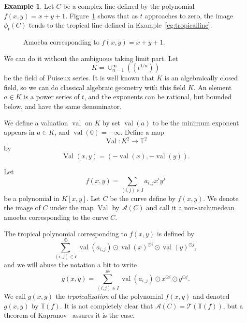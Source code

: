 \documentclass{amsart}
\theoremstyle{definition}
\newtheorem{eg}{Example}[section]
\theoremstyle{remark}
\begin{document}
\begin{eg}
Let $C$ be a complex line defined by the polynomial $f(x,y) = x + y +1$. Figure~\ref{fig:amoeba} shows that as $t$ approaches to zero, the image $\phi_t(C)$ tends to the tropical line defined in Example~\ref{eg:tropicalline}.
\end{eg}

\begin{figure}[htbp]
\begin{center}
\caption{Amoeba corresponding to $f(x,y) = x + y +1$.}\label{fig:amoeba}
\end{center}
\end{figure}

We can do it without the ambiguous taking limit part. Let 
\[
K = \cup_{n=1}^{\infty} ((t^{1/n}))
\]
be the field of Puiseux series. It is well known that $K$ is an algebraically closed field, so we can do classical algebraic geometry with this field $K$. An element $a \in K$ is a power series of $t$, and the exponents can be rational, but bounded below, and have the same denominator. 

We define a valuation $\operatorname{val}$ on $K$ by set $\operatorname{val}(a)$ to be the minimum exponent appears in $a \in K$, and $\operatorname{val}(0) = -\infty$. Define a map
\[
\operatorname{Val} \colon K^2 \to {\mathbb{T}}^2
\]
by 
\[
\operatorname{Val}(x,y) = (-\operatorname{val}(x), -\operatorname{val}(y)).
\]

Let 
\[
f(x,y) = \sum_{(i,j) \in I} a_{i,j} x^i y^j
\]
be a polynomial in $K[x,y]$. Let $C$ be the curve define by $f(x,y)$. We denote the image of $C$ under the map $\operatorname{Val}$ by ${\mathcal{A}}(C)$ and call it a non-archimedean amoeba corresponding to the curve $C$. 

The tropical polynomial corresponding to $f(x,y)$ is defined by
\[
\sum_{(i,j) \in I}^{\oplus} \operatorname{val}(a_{i,j}) {\odot} \operatorname{val}(x)^{{\odot} i} {\odot} \operatorname{val}(y)^{{\odot} j},
\]
and we will abuse the notation a bit to write
\[
g(x,y) = \sum_{(i,j) \in I}^{\oplus} \operatorname{val}(a_{i,j}) {\odot} x^{{\odot} i} {\odot}  y^{{\odot} j}.
\]
We call $g(x,y)$ the \emph{trpoicalization} of the polynomial $f(x,y)$ and denoted $g(x,y)$ by ${\mathbb{T}}(f)$. It is not completely clear that ${\mathcal{A}}(C) = {\mathcal{T}}({\mathbb{T}}(f))$, but a theorem of Kapranov~\cite{gkz94} assures it is the case.
\end{document}
